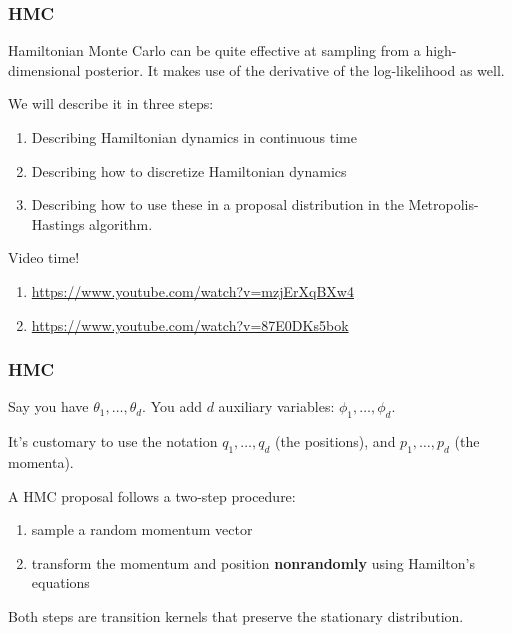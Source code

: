 \documentclass{beamer}
\begin{document}
\begin{frame}
\frametitle{HMC}

Hamiltonian Monte Carlo can be quite effective at sampling from a high-dimensional posterior. It makes use of the derivative of the log-likelihood as well. 
\newline

We will describe it in three steps: 
\begin{enumerate}
\item Describing Hamiltonian dynamics in continuous time
\item Describing how to discretize Hamiltonian dynamics
\item Describing how to use these in a proposal distribution in the Metropolis-Hastings algorithm.
\end{enumerate}

\pause
Video time! 
\begin{enumerate}
\item \url{https://www.youtube.com/watch?v=mzjErXqBXw4}
\item \url{https://www.youtube.com/watch?v=87E0DKs5bok}
\end{enumerate}

\end{frame}

\begin{frame}
\frametitle{HMC}

Say you have $\theta_1, \ldots, \theta_d$. You add $d$ auxiliary variables: $\phi_1, \ldots, \phi_d$.
\newline

It's customary to use the notation $q_1, \ldots, q_d$ (the positions), and $p_1, \ldots, p_d$ (the momenta).
\newline
\pause

A HMC proposal follows a two-step procedure:
\begin{enumerate}
\item sample a random momentum vector
\item transform the momentum and position {\bf nonrandomly} using Hamilton's equations
\end{enumerate}
Both steps are transition kernels that preserve the stationary distribution.

\end{frame}
\end{document}
